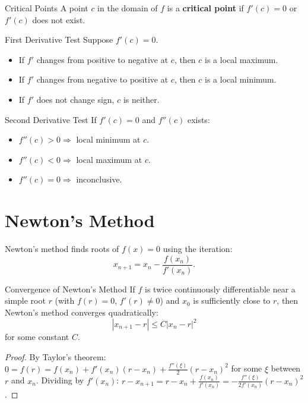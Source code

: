 \documentclass[12pt, openany]{book}
\theoremstyle{plain}
\theoremstyle{definition}
\theoremstyle{remark}
\begin{document}
\begin{defbox}{Critical Points}
A point $c$ in the domain of $f$ is a \textbf{critical point} if $f'(c) = 0$ or $f'(c)$ does not exist.
\end{defbox}
\color{black}

\begin{thmbox}{First Derivative Test}
Suppose $f'(c) = 0$.
\begin{itemize}[noitemsep]
  \item If $f'$ changes from positive to negative at $c$, then $c$ is a local maximum.
  \item If $f'$ changes from negative to positive at $c$, then $c$ is a local minimum.
  \item If $f'$ does not change sign, $c$ is neither.
\end{itemize}
\end{thmbox}
\color{black}

\begin{thmbox}{Second Derivative Test}
If $f'(c) = 0$ and $f''(c)$ exists:
\begin{itemize}[noitemsep]
  \item $f''(c) > 0 \Rightarrow$ local minimum at $c$.
  \item $f''(c) < 0 \Rightarrow$ local maximum at $c$.
  \item $f''(c) = 0 \Rightarrow$ inconclusive.
\end{itemize}
\end{thmbox}
\color{black}

\section{Newton's Method}

Newton's method finds roots of $f(x) = 0$ using the iteration:
\[ x_{n+1} = x_n - \frac{f(x_n)}{f'(x_n)}. \]

\begin{thmbox}{Convergence of Newton's Method}
If $f$ is twice continuously differentiable near a simple root $r$ (with $f(r) = 0$, $f'(r) \neq 0$) and $x_0$ is sufficiently close to $r$, then Newton's method converges quadratically:
\[ |x_{n+1} - r| \leq C|x_n - r|^2 \]
for some constant $C$.
\end{thmbox}
\color{black}

\begin{proof}
By Taylor's theorem: $0 = f(r) = f(x_n) + f'(x_n)(r - x_n) + \frac{f''(\xi)}{2}(r-x_n)^2$ for some $\xi$ between $r$ and $x_n$. Dividing by $f'(x_n)$: $r - x_{n+1} = r - x_n + \frac{f(x_n)}{f'(x_n)} = -\frac{f''(\xi)}{2f'(x_n)}(r-x_n)^2$.
\end{proof}
\end{document}

